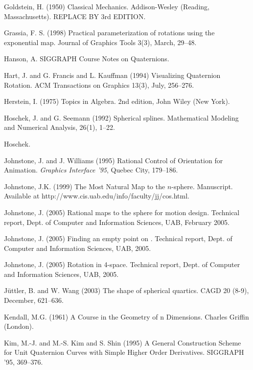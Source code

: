\documentclass[12pt]{article}
\begin{document}
\begin{thebibliography}{99}
Goldstein, H. (1950)
Classical Mechanics.
Addison-Wesley (Reading, Massachusetts).
REPLACE BY 3rd EDITION.

Grassia, F. S. (1998)
Practical parameterization of rotations using the exponential map.
Journal of Graphics Tools 3(3), March, 29--48.

Hanson, A. SIGGRAPH Course Notes on Quaternions.

Hart, J. and G. Francis and L. Kauffman (1994)
Visualizing Quaternion Rotation.
ACM Transactions on Graphics 13(3), July, 256--276.

Herstein, I. (1975) Topics in Algebra.
2nd edition, John Wiley (New York).

Hoschek, J. and G. Seemann (1992)
Spherical splines.
Mathematical Modeling and Numerical Analysis, 26(1), 1--22.

Hoschek.

Johnstone, J. and J. Williams (1995)
Rational Control of Orientation for Animation.
{\em Graphics Interface '95}, Quebec City, 179--186.

Johnstone, J.K. (1999)
The Most Natural Map to the $n$-sphere.
Manuscript.
Available at http://www.cis.uab.edu/info/faculty/jj/cos.html.

Johnstone, J. (2005) Rational maps to the sphere for motion design.
Technical report, Dept. of Computer and Information Sciences, UAB, February 2005.

Johnstone, J. (2005) Finding an empty point on .
Technical report, Dept. of Computer and Information Sciences, UAB, 2005.

Johnstone, J. (2005) Rotation in 4-space.
Technical report, Dept. of Computer and Information Sciences, UAB, 2005.

J\"uttler, B. and W. Wang (2003)
The shape of spherical quartics.
CAGD 20 (8-9), December, 621--636.

Kendall, M.G. (1961)
A Course in the Geometry of n Dimensions.
Charles Griffin (London).

Kim, M.-J. and M.-S. Kim and S. Shin (1995)
A General Construction Scheme for Unit Quaternion Curves
with Simple Higher Order Derivatives.
SIGGRAPH '95, 369--376.


\end{thebibliography}
\end{document}
